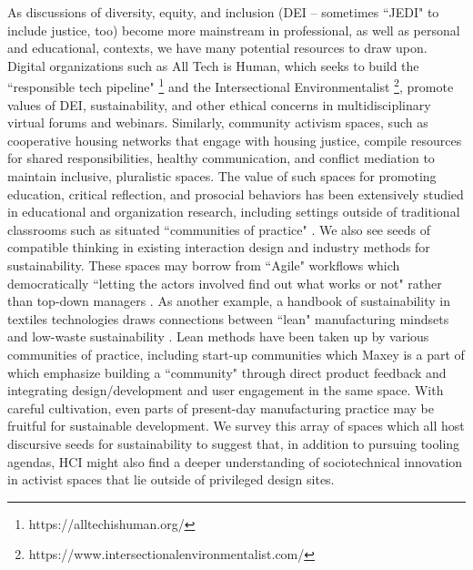 As discussions of diversity, equity, and inclusion (DEI -- sometimes ``JEDI" to include justice, too) become more mainstream in professional, as well as personal and educational, contexts, we have many potential resources to draw upon. Digital organizations such as All Tech is Human, which seeks to build the ``responsible tech pipeline" \footnote{https://alltechishuman.org/} and the Intersectional Environmentalist \footnote{https://www.intersectionalenvironmentalist.com/}, promote values of DEI, sustainability, and other ethical concerns in multidisciplinary virtual forums and webinars. Similarly, community activism spaces, such as cooperative housing networks that engage with housing justice, compile resources for shared responsibilities, healthy communication, and conflict mediation \cite{nahc_national_nodate, aorta_aorta_2021} to maintain inclusive, pluralistic spaces.
The value of such spaces for promoting education, critical reflection, and prosocial behaviors has been extensively studied in educational and organization research, including settings outside of traditional classrooms such as situated ``communities of practice" \cite{wenger_communities_1999}.
We also see seeds of compatible thinking in existing interaction design and industry methods for sustainability. These spaces may borrow from ``Agile" workflows which democratically ``letting the actors involved find out what works or not" rather than top-down managers \cite{rolland_scaling_2016}. As another example, a handbook of sustainability in textiles technologies draws connections between ``lean" manufacturing mindsets and low-waste sustainability \cite{muthu_textiles_2017}. Lean methods have been taken up by various communities of practice, including start-up communities which Maxey is a part of \cite{ries_lean_2011} which emphasize building a ``community" through direct product feedback and integrating design/development and user engagement in the same space. With careful cultivation, even parts of present-day manufacturing practice may be fruitful for sustainable development. We survey this array of spaces which all host discursive seeds for sustainability to suggest that, in addition to pursuing tooling agendas, HCI might also find a deeper understanding of sociotechnical innovation in activist spaces that lie outside of privileged design sites.



